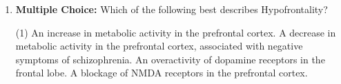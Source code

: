 \begin{enumerate}[label=\textbf{Q4.1.\arabic*}]

    \item \textbf{Multiple Choice:} Which of the following best describes Hypofrontality?
    \begin{tasks}[label=\textcolor{\documentTheme}{(\Alph*)}, item-format=\color{\documentTheme}, label-width=1.5em, item-indent=1.7em](1)
        \task An increase in metabolic activity in the prefrontal cortex.
        \task A decrease in metabolic activity in the prefrontal cortex, associated with negative symptoms of schizophrenia.
        \task An overactivity of dopamine receptors in the frontal lobe.
        \task A blockage of NMDA receptors in the prefrontal cortex.
    \end{tasks}


\end{enumerate}
